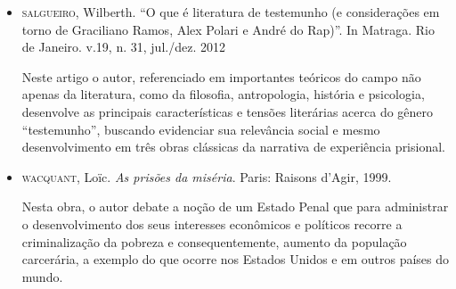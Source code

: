 \documentclass[11pt]{extarticle}
\begin{document}
\begin{itemize}
\item\textsc{salgueiro}, Wilberth. ``O que é literatura de testemunho (e considerações
em torno de Graciliano Ramos, Alex Polari e André do Rap)''. In Matraga.
Rio de Janeiro. v.19, n. 31, jul./dez. 2012  

Neste artigo o autor, referenciado em importantes teóricos do campo não apenas 
da literatura, como da filosofia, antropologia, história e psicologia, desenvolve as
principais características e tensões literárias acerca do gênero
``testemunho'', buscando evidenciar sua relevância social e mesmo
desenvolvimento em três obras clássicas da narrativa de experiência
prisional.



\item\textsc{wacquant}, Loïc. \textit{As prisões da miséria}. Paris: Raisons d'Agir,
1999. 

Nesta obra, o autor debate a noção de um Estado Penal que para
administrar o desenvolvimento dos seus interesses econômicos e políticos
recorre a criminalização da pobreza e consequentemente, aumento da
população carcerária, a exemplo do que ocorre nos Estados Unidos e em
outros países do mundo.
\end{itemize}
\end{document}
